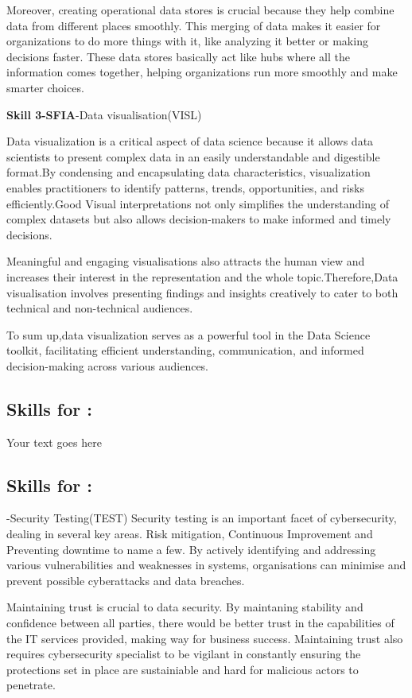 \documentclass[a4paper, 11pt]{report}
\begin{document}
{Moreover, creating operational data stores is crucial because they help combine data from different places smoothly. This merging of data makes it easier for organizations to do more things with it, like analyzing it better or making decisions faster. These data stores basically act like hubs where all the information comes together, helping organizations run more smoothly and make smarter choices.

\textbf{Skill 3-SFIA}-Data visualisation(VISL)\cite{sfiads}

Data visualization is a critical aspect of data science because it allows data scientists to present complex data in an easily understandable and digestible format\cite{gfg}.By condensing and encapsulating data characteristics, visualization enables practitioners to identify patterns, trends, opportunities, and risks efficiently.Good Visual interpretations not only simplifies the understanding of complex datasets but also allows decision-makers to make informed and timely decisions. 

Meaningful and engaging visualisations also attracts the human view and increases their interest in the representation and the whole topic.Therefore,Data visualisation involves presenting findings and insights creatively to cater to both technical and non-technical audiences\cite{sfia3}.

To sum up,data visualization serves as a powerful tool in the Data Science toolkit, facilitating efficient understanding, communication, and informed decision-making across various audiences.

\subsection{Skills for \majC: \studC}
Your text goes here
\subsection{Skills for \majD: \studD}-Security Testing(TEST)\cite{}
Security testing is an important facet of cybersecurity, dealing in several key areas. Risk mitigation, Continuous Improvement and Preventing downtime to name a few. By actively identifying and addressing various vulnerabilities and weaknesses in systems, organisations can minimise and prevent possible cyberattacks and data breaches.

Maintaining trust is crucial to data security. By maintaning stability and confidence between all parties, there would be better trust in the capabilities of the IT services provided, making way for business success. Maintaining trust also requires cybersecurity specialist to be vigilant in constantly ensuring the protections set in place are sustainiable and hard for malicious actors to penetrate.

}
\end{document}
